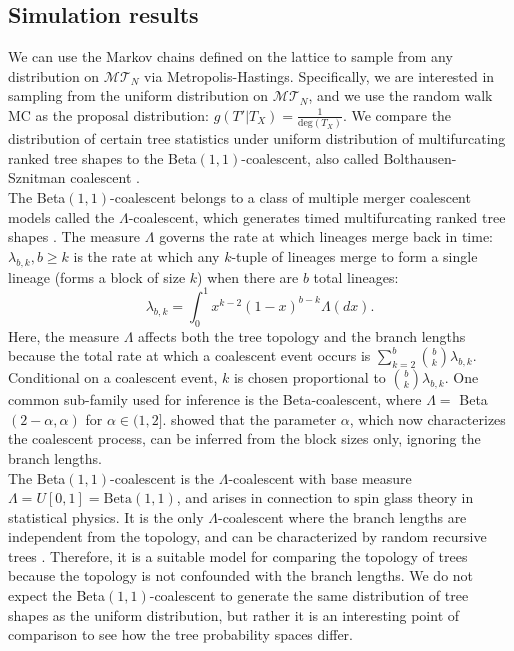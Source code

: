 \documentclass{article}
\begin{document}
\subsection{Simulation results} 
We can use the Markov chains defined on the lattice to sample from any distribution on $\mathcal{MT}_N$ via Metropolis-Hastings. Specifically, we are interested in sampling from the uniform distribution on $\mathcal{MT}_N$, and we use the random walk MC as the proposal distribution: $g(T' |T_X) = \frac{1}{\text{deg}(T_X)}$. We compare the distribution of certain tree statistics under uniform distribution of multifurcating ranked tree shapes to the Beta$(1,1)$-coalescent, also called Bolthausen-Sznitman coalescent \citep{bolthausen1998ruelle}. \\

The Beta$(1,1)$-coalescent belongs to a class of multiple merger coalescent models called the $\Lambda$-coalescent, which generates timed multifurcating ranked tree shapes  \citep{sagitov1999general,pitman1999coalescents}. The measure $\Lambda$ governs the rate at which lineages merge back in time: $\lambda_{b,k}, b\geq k$ is the rate at which any $k$-tuple of lineages merge to form a single lineage (forms a block of size $k$) when there are $b$ total lineages: \[ \lambda_{b,k} =\int_0^1 x^{k-2} (1-x)^{b-k} \Lambda(dx) .\] Here, the measure $\Lambda$ affects both the tree topology and the branch lengths because the total rate at which a coalescent event occurs is $\sum_{k=2}^b \binom{b}{k} \lambda_{b,k}$. Conditional on a coalescent event, $k$ is chosen proportional to $\binom{b}{k} \lambda_{b,k}$. One common sub-family used for inference is the Beta-coalescent, where $\Lambda=$ Beta$(2-\alpha, \alpha)$ for $\alpha \in (1,2]$. \cite{zhang2025multiple} showed that the parameter $\alpha$, which now characterizes the coalescent process, can be inferred from the block sizes only, ignoring the branch lengths. \\ 

The Beta$(1,1)$-coalescent is the $\Lambda$-coalescent with base measure $\Lambda=U[0,1]=\text{Beta}(1,1)$, and arises in connection to spin glass theory in statistical physics. It is the only $\Lambda$-coalescent where the branch lengths are independent from the topology, and can be characterized by random recursive trees \citep{Goldschmidt2015}. Therefore, it is a suitable model for comparing the topology of trees because the topology is not confounded with the branch lengths. We do not expect the Beta$(1,1)$-coalescent to generate the same distribution of tree shapes as the uniform distribution, but rather it is an interesting point of comparison to see how the tree probability spaces differ. \\
\end{document}
